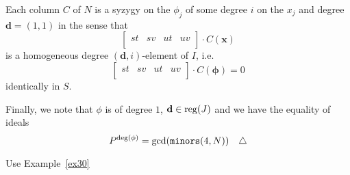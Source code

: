 \documentclass[fleqn,reqno]{amsart}
\begin{document}
\begin{example}[$\mt{ex203}$]
Each column $C$ of $N$ is a syzygy on the $\phi_j$ of some degree $i$ on the $x_j$
and degree $\mathbf d=(1,1)$ in the sense that
\[
	\begin{bmatrix}s t&
	       s v&
	       u t&
	       u v\\
	       \end{bmatrix}
		   \cdot C(\mathbf x)
\]
is a homogeneous degree $(\mathbf d,i)$-element of $I$, i.e.
\[
	\begin{bmatrix}s t&
	       s v&
	       u t&
	       u v\\
	       \end{bmatrix}
		   \cdot C(\mathbf\phi)=0
\]
identically in $S$.

Finally, we note that $\phi$ is of degree $1$, $\mathbf d\in\operatorname{reg}(J)$ and we have the equality of ideals
\[
	P^{\deg(\phi)}=\gcd(\mt{minors}(4,N))\demo
\]
\end{example}

\begin{example}[$\mt{ex204}$]
\label{ex204}
Use Example~\ref{ex30}
\end{example}





\end{document}
